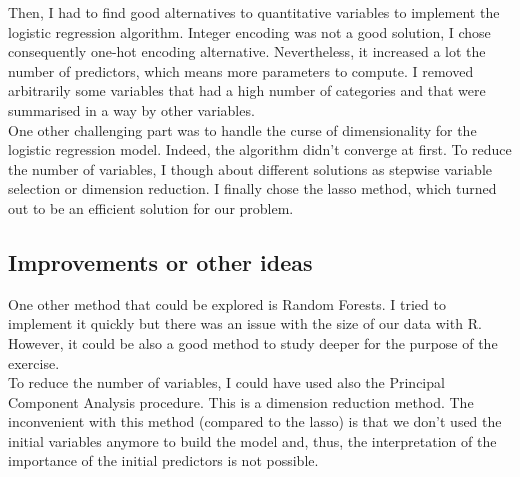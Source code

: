 \documentclass{article}
\begin{document}
\noindent Then, I had to find good alternatives to quantitative variables to implement the logistic regression algorithm. Integer encoding was not a good solution, I chose consequently one-hot encoding alternative. Nevertheless, it increased a lot the number of predictors, which means more parameters to compute. I removed arbitrarily some variables that had a high number of categories and that were summarised in a way by other variables.\\

\noindent One other challenging part was to handle the curse of dimensionality for the logistic regression model. Indeed, the algorithm didn't converge at first. To reduce the number of variables, I though about different solutions as stepwise variable selection or dimension reduction. I finally chose the lasso method, which turned out to be an efficient solution for our problem.

\noindent 
\subsection{Improvements or other ideas}
\noindent One other method that could be explored is Random Forests. I tried to implement it quickly but there was an issue with the size of our data with R. However, it could be also a good method to study deeper for the purpose of the exercise. \\

\noindent To reduce the number of variables, I could have used also the Principal Component Analysis procedure. This is a dimension reduction method. The inconvenient with this method (compared to the lasso) is that we don't used the initial variables anymore to build the model and, thus, the interpretation of the importance of the initial predictors is not possible.
\end{document}
